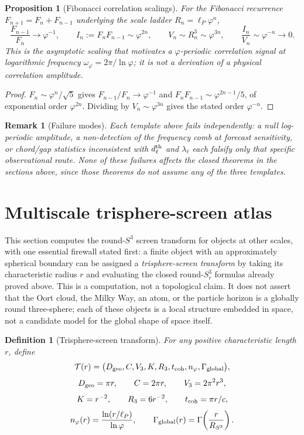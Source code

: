 \documentclass[11pt,a4paper]{article}
\newtheorem{proposition}[theorem]{Proposition}
\newtheorem{definition}[theorem]{Definition}
\newtheorem{remark}[theorem]{Remark}
\begin{document}
\begin{proposition}[Fibonacci correlation scalings]
For the Fibonacci recurrence $F_{n+1}=F_n+F_{n-1}$ underlying the scale ladder $R_n=\ell_P\varphi^n$,
\[
\frac{F_{n-1}}{F_n}\to\varphi^{-1},
\qquad
I_n:=F_nF_{n-1}\sim\varphi^{2n},
\qquad
V_n\sim R_n^3\sim\varphi^{3n},
\qquad
\frac{I_n}{V_n}\sim\varphi^{-n}\to0.
\]
This is the asymptotic scaling that motivates a $\varphi$-periodic correlation signal at logarithmic frequency $\omega_\varphi=2\pi/\ln\varphi$; it is not a derivation of a physical correlation amplitude.
\end{proposition}
\begin{proof}
$F_n\sim\varphi^n/\sqrt5$ gives $F_{n-1}/F_n\to\varphi^{-1}$ and $F_nF_{n-1}\sim\varphi^{2n-1}/5$, of exponential order $\varphi^{2n}$.  Dividing by $V_n\sim\varphi^{3n}$ gives the stated order $\varphi^{-n}$.
\end{proof}

\begin{remark}[Failure modes]
Each template above fails independently: a null log-periodic amplitude, a non-detection of the frequency comb at forecast sensitivity, or chord/gap statistics inconsistent with $d_\ell^{\rm th}$ and $\lambda_\ell$ each falsify only that specific observational route.  None of these failures affects the closed theorems in the sections above, since those theorems do not assume any of the three templates.
\end{remark}

\section{Multiscale trisphere-screen atlas}
\label{sec:multiscale-trisphere-atlas}

This section computes the round-$S^3$ screen transform for objects at other scales, with one essential firewall stated first: a finite object with an approximately spherical boundary can be assigned a \emph{trisphere-screen transform} by taking its characteristic radius $r$ and evaluating the closed round-$S^3_r$ formulas already proved above.  This is a computation, not a topological claim.  It does not assert that the Oort cloud, the Milky Way, an atom, or the particle horizon is a globally round three-sphere; each of these objects is a local structure embedded in space, not a candidate model for the global shape of space itself.

\begin{definition}[Trisphere-screen transform]
For any positive characteristic length $r$, define
\[
\mathcal T(r)=\bigl(D_{\rm geo},C,V_3,K,R_3,t_{\rm coh},n_\varphi,\Gamma_{\rm global}\bigr),
\]
\[
D_{\rm geo}=\pi r,\qquad C=2\pi r,\qquad V_3=2\pi^2r^3,
\]
\[
K=r^{-2},\qquad R_3=6r^{-2},\qquad t_{\rm coh}=\pi r/c,
\]
\[
n_\varphi(r)=\frac{\ln(r/\ell_P)}{\ln\varphi},
\qquad
\Gamma_{\rm global}(r)=\Gamma\!\left(\frac{r}{R_{S^3}}\right).
\]
\end{definition}
\end{document}
